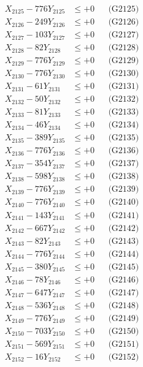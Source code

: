 \documentclass[a4paper,10pt]{article}
\begin{document}
{\begin{align}
X_{2125} - 776Y_{2125} &\leq +0 && \text{(G2125)} \\
X_{2126} - 249Y_{2126} &\leq +0 && \text{(G2126)} \\
X_{2127} - 103Y_{2127} &\leq +0 && \text{(G2127)} \\
X_{2128} - 82Y_{2128} &\leq +0 && \text{(G2128)} \\
X_{2129} - 776Y_{2129} &\leq +0 && \text{(G2129)} \\
X_{2130} - 776Y_{2130} &\leq +0 && \text{(G2130)} \\
\allowbreak
X_{2131} - 61Y_{2131} &\leq +0 && \text{(G2131)} \\
X_{2132} - 50Y_{2132} &\leq +0 && \text{(G2132)} \\
X_{2133} - 81Y_{2133} &\leq +0 && \text{(G2133)} \\
X_{2134} - 46Y_{2134} &\leq +0 && \text{(G2134)} \\
X_{2135} - 389Y_{2135} &\leq +0 && \text{(G2135)} \\
X_{2136} - 776Y_{2136} &\leq +0 && \text{(G2136)} \\
X_{2137} - 354Y_{2137} &\leq +0 && \text{(G2137)} \\
X_{2138} - 598Y_{2138} &\leq +0 && \text{(G2138)} \\
X_{2139} - 776Y_{2139} &\leq +0 && \text{(G2139)} \\
X_{2140} - 776Y_{2140} &\leq +0 && \text{(G2140)} \\
\allowbreak
X_{2141} - 143Y_{2141} &\leq +0 && \text{(G2141)} \\
X_{2142} - 667Y_{2142} &\leq +0 && \text{(G2142)} \\
X_{2143} - 82Y_{2143} &\leq +0 && \text{(G2143)} \\
X_{2144} - 776Y_{2144} &\leq +0 && \text{(G2144)} \\
X_{2145} - 380Y_{2145} &\leq +0 && \text{(G2145)} \\
X_{2146} - 78Y_{2146} &\leq +0 && \text{(G2146)} \\
X_{2147} - 647Y_{2147} &\leq +0 && \text{(G2147)} \\
X_{2148} - 536Y_{2148} &\leq +0 && \text{(G2148)} \\
X_{2149} - 776Y_{2149} &\leq +0 && \text{(G2149)} \\
X_{2150} - 703Y_{2150} &\leq +0 && \text{(G2150)} \\
\allowbreak
X_{2151} - 569Y_{2151} &\leq +0 && \text{(G2151)} \\
X_{2152} - 16Y_{2152} &\leq +0 && \text{(G2152)} \\

\end{align}}
\end{document}
